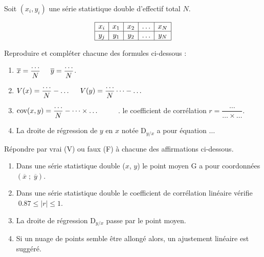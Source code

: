 



 \summary{}
 
	
	\begin{exercice}	
 Soit $(x_i , y_i)$  une série statistique double d'effectif total $ N $.

\medskip

$$
\begin{array}{|c|c|c|c|c|}
 \hline
  x_i   & x_1 & x_2 &  \dots & x_N \\ 
 \hline
   y_j   & y_1 & y_2 & \dots & y_N \\ \hline
\end{array}$$

\medskip

Reproduire et compléter chacune des formules ci-dessous :


\begin{enumerate}
\item  $ \overline{x}=\dfrac{\dots}{N}  \hspace*{0.5cm}   \overline{y}=\dfrac{\dots}{N} $.
 \item   $ V(x)=\dfrac{\dots}{N}-\dots   \hspace*{0.5cm}   V(y)=\dfrac{\dots}{N}\dots-\dots $
 
 \item   $ \text{cov}(x,y)=\dfrac{\dots}{N}- \dots \times \dots \hspace*{1cm}$. le coefficient de corrélation $ r= \dfrac{\dots}{\dots \times \dots}$.
 \item  La droite de régression de  $ y $ en $ x $ notée D$_{ y/x }$  a pour équation $ \dots $

\end{enumerate}
\end{exercice}
\begin{exercice}

Répondre par vrai (V) ou faux (F) à chacune des affirmations ci-dessous.


\begin{enumerate}
\item Dans une série statistique double ($x$, $y$) le point moyen G a pour coordonnées $ ( \overline{x}\;;\; \overline{y}) $.
\item Dans une série statistique double le coefficient de corrélation linéaire vérifie  $\; 0.87\leq |r|\leq 1 $. 
\item La droite de régression  D$_{ y/x }$  passe par  le point moyen.
\item Si un nuage de points semble être allongé alors, un ajustement linéaire est suggéré.
\end{enumerate}
\end{exercice}
